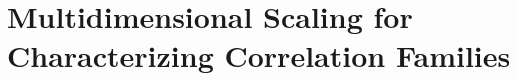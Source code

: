 \subsection{}

\subsection{}

\subsection{}

\subsection{}



\section{Multidimensional Scaling for Characterizing Correlation Families}

\subsection{}

\subsection{}

\subsection{}

\subsection{}